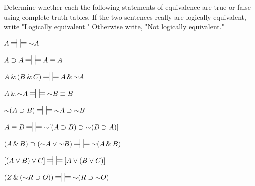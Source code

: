 \noindent\problempart
\label{pr.TT.equiv}
Determine whether each the following statements of equivalence are true or false using complete truth tables. If the two sentences really are logically equivalent, write "Logically equivalent." Otherwise write, "Not logically equivalent." 
\begin{exercises}
\item $A\ndststile{}{} \hspace{.5em} \sdtstile{}{}\enot A$\vspace{.5ex} 											%
\item $A\eif A\ndststile{}{} \hspace{.5em} \sdtstile{}{}A \eiff A$\vspace{.5ex} 									%
\item $A	\eand (B	\eand C)\ndststile{}{} \hspace{.5em} \sdtstile{}{} A \eand \enot A$\vspace{.5ex}  					%
\item $A \eand \enot A\ndststile{}{} \hspace{.5em} \sdtstile{}{}\enot B \eiff B$ \vspace{.5ex}						%
\item $\enot(A \eif B)\ndststile{}{} \hspace{.5em} \sdtstile{}{}\enot A \eif \enot B$\vspace{.5ex}					%
\item $A \eiff B\ndststile{}{} \hspace{.5em} \sdtstile{}{}\enot[(A \eif B) \eif \enot (B\eif A)]$\vspace{.5ex}			%
\item $(A \eand B) \eif (\enot A \eor \enot B)\ndststile{}{} \hspace{.5em} \sdtstile{}{} \enot(A\eand B)$\vspace{.5ex}	%
\item $[(A \eor B) \eor C]\ndststile{}{} \hspace{.5em} \sdtstile{}{}[A \eor (B \eor C)]$\vspace{.5ex} 				%
\item $ (Z \eand (\enot R \eif O))\ndststile{}{} \hspace{.5em} \sdtstile{}{} \enot (R \eif \enot O) $\vspace{.5ex}		%

\end{exercises}

